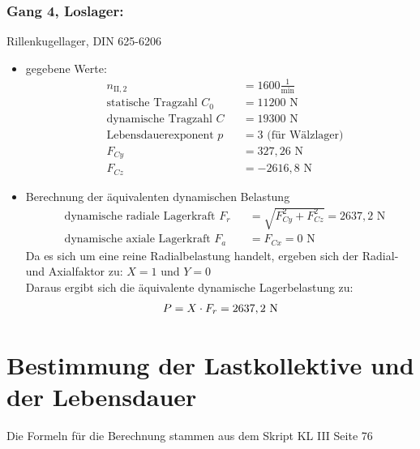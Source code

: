 \subsubsection{Gang 4, Loslager:} Rillenkugellager, DIN 625-6206\\
\begin{itemize}
	\item gegebene Werte:
	\begin{align*}
	&n_{{\mathord{\mathrm{II}},2}} &&=  1600 \frac{1}{\text{min}} \\
	&\text{statische Tragzahl } C_{0} &&= 11200 \text{ N}\\
	&\text{dynamische Tragzahl } C &&= 19300\text{ N} \\
	&\text{Lebensdauerexponent } p &&= 3 \text{ (für Wälzlager)} \\
	&F_{Cy} && = 327,26 \text{ N}\\
	&F_{Cz} && = -2616,8 \text{ N}
	\end{align*} 
	\item Berechnung der äquivalenten dynamischen Belastung
	\begin{align*}
	&\text{dynamische radiale Lagerkraft } F_r&& = \sqrt{F_{Cy}^2 + F_{Cz}^2 } =2637,2 \text{ N} \\
	&\text{dynamische axiale Lagerkraft } F_a&& = F_{Cx} = 0\text{ N}
	\end{align*} 
	Da es sich um eine reine Radialbelastung handelt, ergeben sich der Radial- und Axialfaktor zu: $X= 1$ und $Y=0$\\
	Daraus ergibt sich die äquivalente dynamische Lagerbelastung zu:  
	\[
	P= X \cdot F_r =2637,2\text{ N}
	\]
\end{itemize}
\newpage

\section{Bestimmung der Lastkollektive und der Lebensdauer}
Die Formeln für die Berechnung stammen aus dem Skript KL III Seite 76
